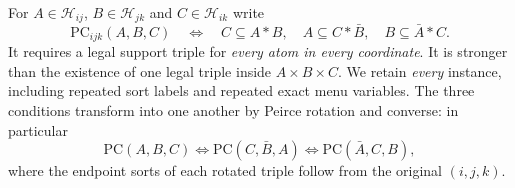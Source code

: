 For $A\in\mathcal H_{ij}$, $B\in\mathcal H_{jk}$ and
$C\in\mathcal H_{ik}$ write
\begin{equation}\label{eq:typed-PC}
 \mathrm{PC}_{ijk}(A,B,C)\quad\Longleftrightarrow\quad
 C\subseteq A*B,\quad
 A\subseteq C*\bar B,\quad
 B\subseteq\bar A*C.
\end{equation}
It requires a legal support triple for \emph{every atom in every
coordinate}.  It is stronger than the existence of one legal triple
inside $A\times B\times C$.  We retain \emph{every} instance,
including repeated sort labels and repeated exact menu variables.
The three conditions transform into one another by Peirce rotation
and converse: in particular
\begin{equation}\label{eq:typed-PC-rotation}
 \mathrm{PC}(A,B,C)\Longleftrightarrow
 \mathrm{PC}(C,\bar B,A)\Longleftrightarrow
 \mathrm{PC}(\bar A,C,B),
\end{equation}
where the endpoint sorts of each rotated triple follow from the
original $(i,j,k)$.

